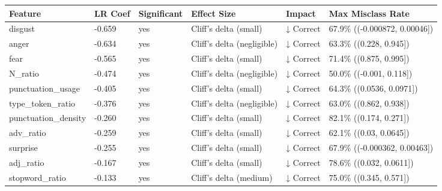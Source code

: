 \begin{tabular}{llllll}
\toprule
Feature & LR Coef & Significant & Effect Size & Impact & Max Misclass Rate \\
\midrule
disgust & -0.659 & yes & Cliff's delta (small) & ↓ Correct & 67.9\% ((-0.000872, 0.00046]) \\
anger & -0.634 & yes & Cliff's delta (negligible) & ↓ Correct & 63.3\% ((0.228, 0.945]) \\
fear & -0.565 & yes & Cliff's delta (small) & ↓ Correct & 71.4\% ((0.875, 0.995]) \\
N\_ratio & -0.474 & yes & Cliff's delta (negligible) & ↓ Correct & 50.0\% ((-0.001, 0.118]) \\
punctuation\_usage & -0.405 & yes & Cliff's delta (small) & ↓ Correct & 64.3\% ((0.0536, 0.0971]) \\
type\_token\_ratio & -0.376 & yes & Cliff's delta (negligible) & ↓ Correct & 63.0\% ((0.862, 0.938]) \\
punctuation\_density & -0.260 & yes & Cliff's delta (small) & ↓ Correct & 82.1\% ((0.174, 0.271]) \\
adv\_ratio & -0.259 & yes & Cliff's delta (small) & ↓ Correct & 62.1\% ((0.03, 0.0645]) \\
surprise & -0.255 & yes & Cliff's delta (small) & ↓ Correct & 67.9\% ((-0.000362, 0.00463]) \\
adj\_ratio & -0.167 & yes & Cliff's delta (small) & ↓ Correct & 78.6\% ((0.032, 0.0611]) \\
stopword\_ratio & -0.133 & yes & Cliff's delta (medium) & ↓ Correct & 75.0\% ((0.345, 0.571]) \\
\bottomrule
\end{tabular}
